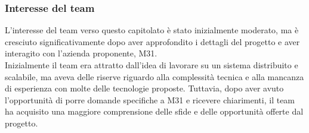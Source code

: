 \documentclass[a4paper,11pt]{article}
\begin{document}
\subsubsection{Interesse del team}
\parbox[t]{\linewidth}{%
L'interesse del team verso questo capitolato è stato inizialmente moderato, ma è cresciuto significativamente dopo aver approfondito i dettagli del progetto e aver interagito con l'azienda proponente, M31. \\
Inizialmente il team era attratto dall'idea di lavorare su un sistema distribuito e scalabile, ma aveva delle riserve riguardo alla complessità tecnica e alla mancanza di esperienza con molte delle tecnologie proposte. Tuttavia, dopo aver avuto l'opportunità di porre domande specifiche a M31 e ricevere chiarimenti, il team ha acquisito una maggiore comprensione delle sfide e delle opportunità offerte dal progetto. \\

}
\newpage
\end{document}
